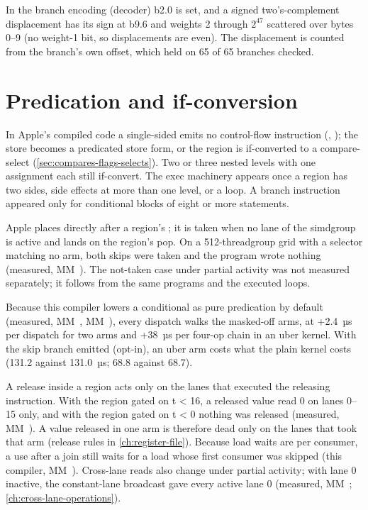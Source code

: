 In the branch encoding (decoder) b2.0 is set, and a signed two's-complement displacement has its sign at b9.6 and
weights 2 through $2^{47}$ scattered over bytes 0–9 (no weight-1 bit, so displacements are even). The displacement is
counted from the branch's own offset, which held on 65 of 65 branches checked.

\section{Predication and if-conversion}\label{sec:predication-if-conversion}

In Apple's compiled code a single-sided  emits no control-flow instruction (,
); the store becomes a predicated store form, or the region is
if-converted to a compare-select (\cref{sec:compares-flags-selects}). Two or three nested levels with one assignment each still if-convert.
The exec machinery appears once a region has two sides, side effects at more than one level, or a loop. A branch
instruction appeared only for conditional blocks of eight or more statements.

Apple places 
directly after a region's ; it is taken when no lane of the simdgroup is active and lands
on the region's pop. On a 512-threadgroup grid with a selector matching no arm, both skips were taken and the program wrote
nothing (measured, MM~). The not-taken case under partial activity was not measured separately; it follows
from the same programs and the executed loops.

Because this compiler lowers a
conditional as pure predication by default (measured, MM~, MM~), every dispatch walks the
masked-off arms, at +2.4~µs per dispatch for two arms and +38~µs per four-op chain in an uber kernel. With the skip branch emitted (opt-in), an uber arm costs what the plain
kernel costs (131.2 against 131.0~µs; 68.8 against 68.7).

A release inside a region acts only on the lanes that executed the releasing instruction. With the region gated on
t < 16, a released value read 0 on lanes 0–15 only, and with the region gated on t < 0 nothing was released (measured,
MM~). A value released in one arm is therefore dead only on the lanes that took that arm (release rules in
\cref{ch:register-file}). Because load waits are per consumer, a use after a join still waits for a load whose first
consumer was skipped (this compiler, MM~). Cross-lane reads also change under partial activity; with
lane 0 inactive, the constant-lane broadcast gave every active lane 0 (measured, MM~; \cref{ch:cross-lane-operations}).

